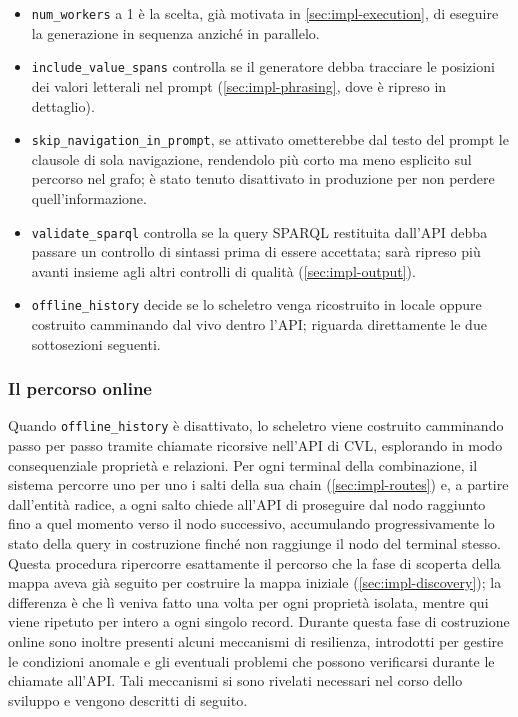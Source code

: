 \documentclass[12pt,a4paper,openright,twoside]{book}
\begin{document}
\begin{itemize}
    \item \texttt{num\_workers} a 1 è la scelta, già motivata in
          \cref{sec:impl-execution}, di eseguire la generazione in sequenza
          anziché in parallelo.
    \item \texttt{include\_value\_spans} controlla se il generatore debba
          tracciare le posizioni dei valori letterali nel prompt
          (\cref{sec:impl-phrasing}, dove è ripreso in dettaglio).
    \item \texttt{skip\_navigation\_in\_prompt}, se attivato ometterebbe dal
          testo del prompt le clausole di sola navigazione, rendendolo più corto
          ma meno esplicito sul percorso nel grafo; è stato tenuto disattivato
          in produzione per non perdere quell'informazione.
    \item \texttt{validate\_sparql} controlla se la query SPARQL restituita
          dall'API debba passare un controllo di sintassi prima di essere
          accettata; sarà ripreso più avanti insieme agli altri controlli di
          qualità (\cref{sec:impl-output}).
    \item \texttt{offline\_history} decide se lo scheletro venga ricostruito in
          locale oppure costruito camminando dal vivo dentro l'API; riguarda
          direttamente le due sottosezioni seguenti.
\end{itemize}

\subsubsection{Il percorso online}

Quando \texttt{offline\_history} è disattivato, lo scheletro viene costruito
camminando passo per passo tramite chiamate ricorsive nell'API di CVL,
esplorando in modo consequenziale proprietà e relazioni. Per ogni terminal della
combinazione, il sistema percorre uno per uno i salti della sua chain
(\cref{sec:impl-routes}) e, a partire dall'entità radice, a ogni salto chiede
all'API di proseguire dal nodo raggiunto fino a quel momento verso il nodo
successivo, accumulando progressivamente lo stato della query in costruzione
finché non raggiunge il nodo del terminal stesso. Questa procedura ripercorre
esattamente il percorso che la fase di scoperta della mappa aveva già seguito
per costruire la mappa iniziale (\cref{sec:impl-discovery}); la differenza è che
lì veniva fatto una volta per ogni proprietà isolata, mentre qui viene ripetuto
per intero a ogni singolo record. Durante questa fase di costruzione online sono
inoltre presenti alcuni meccanismi di resilienza, introdotti per gestire le
condizioni anomale e gli eventuali problemi che possono verificarsi durante le
chiamate all'API. Tali meccanismi si sono rivelati necessari nel corso dello
sviluppo e vengono descritti di seguito.
\end{document}

